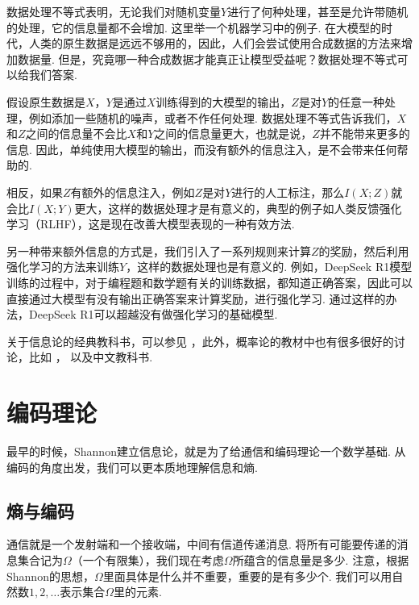 数据处理不等式表明，无论我们对随机变量$Y$进行了何种处理，甚至是允许带随机的处理，它的信息量都不会增加. 这里举一个机器学习中的例子. 在大模型的时代，人类的原生数据是远远不够用的，因此，人们会尝试使用合成数据的方法来增加数据量. 但是，究竟哪一种合成数据才能真正让模型受益呢？数据处理不等式可以给我们答案. 

假设原生数据是$X$，$Y$是通过$X$训练得到的大模型的输出，$Z$是对$Y$的任意一种处理，例如添加一些随机的噪声，或者不作任何处理. 数据处理不等式告诉我们，$X$和$Z$之间的信息量不会比$X$和$Y$之间的信息量更大，也就是说，$Z$并不能带来更多的信息. 因此，单纯使用大模型的输出，而没有额外的信息注入，是不会带来任何帮助的.

相反，如果$Z$有额外的信息注入，例如$Z$是对$Y$进行的人工标注，那么$I(X;Z)$就会比$I(X;Y)$更大，这样的数据处理才是有意义的，典型的例子如人类反馈强化学习（RLHF），这是现在改善大模型表现的一种有效方法.

另一种带来额外信息的方式是，我们引入了一系列规则来计算$Z$的奖励，然后利用强化学习的方法来训练$Y$，这样的数据处理也是有意义的. 例如，DeepSeek R1模型训练的过程中，对于编程题和数学题有关的训练数据，都知道正确答案，因此可以直接通过大模型有没有输出正确答案来计算奖励，进行强化学习. 通过这样的办法，DeepSeek R1可以超越没有做强化学习的基础模型. 

\begin{remark}
    关于信息论的经典教科书，可以参见 \cite{coverElementsInformationTheory2012} ，此外，概率论的教材中也有很多很好的讨论，比如 \cite{durrettProbabilityTheoryExamples2019}，\cite{shiryaevProbability1996} 以及中文教科书\cite{LiXianPingGaiLuLunJiChu2010}.
\end{remark}

\section{编码理论}\label{sec:entropy-and-communication}
最早的时候，Shannon建立信息论，就是为了给通信和编码理论一个数学基础. 从编码的角度出发，我们可以更本质地理解信息和熵. 

\subsection{熵与编码}

通信就是一个发射端和一个接收端，中间有信道传递消息. 将所有可能要传递的消息集合记为$\Omega$（一个有限集），我们现在考虑$\Omega$所蕴含的信息量是多少. 注意，根据Shannon的思想，$\Omega$里面具体是什么并不重要，重要的是有多少个. 我们可以用自然数$1,2,\dots$表示集合$\Omega$里的元素. 

